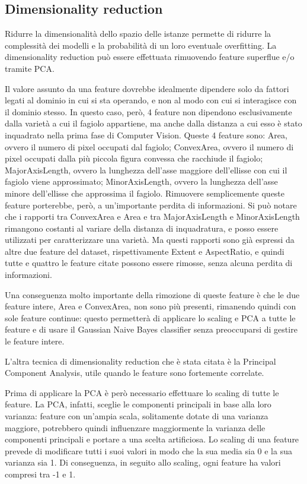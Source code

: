 \subsection{Dimensionality reduction}
Ridurre la dimensionalità dello spazio delle istanze permette di ridurre la
complessità dei modelli e la probabilità di un loro eventuale overfitting.
La dimensionality reduction può essere effettuata rimuovendo feature superflue
e/o tramite PCA.

Il valore assunto da una feature dovrebbe idealmente dipendere solo
da fattori legati al dominio in cui si sta operando, e non al modo con cui 
si interagisce con il dominio stesso. 
In questo caso, però, 4 feature non dipendono esclusivamente dalla varietà a cui
il fagiolo appartiene, ma anche dalla distanza a cui esso è stato
inquadrato nella prima fase di Computer Vision. Queste 4 feature sono: 
Area, ovvero il numero di pixel occupati dal fagiolo; ConvexArea, ovvero il
numero di pixel occupati dalla più piccola figura convessa che racchiude
il fagiolo; MajorAxisLength, ovvero la lunghezza dell'asse maggiore dell'ellisse
con cui il fagiolo viene approssimato; MinorAxisLength, ovvero la lunghezza
dell'asse minore dell'ellisse che approssima il fagiolo.
Rimuovere semplicemente queste feature porterebbe, però, a un'importante perdita
di informazioni. Si può notare che i rapporti tra ConvexArea e Area
e tra MajorAxisLength e MinorAxisLength rimangono costanti al variare della
distanza di inquadratura, e posso essere utilizzati per caratterizzare una
varietà.
Ma questi rapporti sono già espressi da altre due feature del dataset,
rispettivamente Extent e AspectRatio, e quindi tutte e quattro le feature
citate possono essere rimosse, senza alcuna perdita di informazioni.

Una conseguenza molto importante della rimozione di queste feature è che le
due feature intere, Area e ConvexArea, non sono più presenti, rimanendo quindi con sole
feature continue: questo permetterà di applicare lo scaling e PCA a tutte le
feature e di usare il Gaussian Naive Bayes classifier senza preoccuparsi di
gestire le feature intere.

L'altra tecnica di dimensionality reduction che è stata citata è
la Principal Component Analysis, utile quando le feature sono fortemente correlate.

Prima di applicare la PCA è però necessario effettuare lo scaling di tutte
le feature. La PCA, infatti, sceglie le componenti principali in base alla
loro varianza: feature con un'ampia scala, solitamente dotate di una 
varianza maggiore, potrebbero quindi influenzare maggiormente la varianza delle
componenti principali e portare a una scelta artificiosa.
Lo scaling di una feature prevede di modificare tutti i suoi valori in modo 
che la sua media sia 0 e la sua varianza sia 1.
Di conseguenza, in seguito allo scaling, ogni feature ha valori compresi tra -1
e 1.

